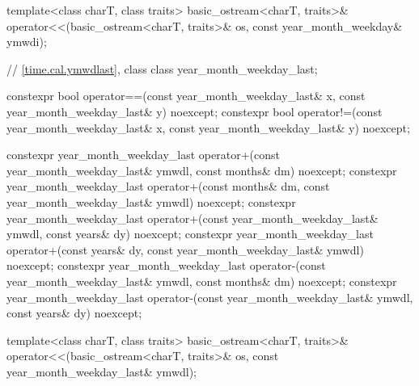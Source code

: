 \begin{codeblock}
{{    template<class charT, class traits>
      basic_ostream<charT, traits>&
        operator<<(basic_ostream<charT, traits>& os, const year_month_weekday& ymwdi);

    // \ref{time.cal.ymwdlast}, class 
    class year_month_weekday_last;

    constexpr bool operator==(const year_month_weekday_last& x,
                              const year_month_weekday_last& y) noexcept;
    constexpr bool operator!=(const year_month_weekday_last& x,
                              const year_month_weekday_last& y) noexcept;

    constexpr year_month_weekday_last
      operator+(const year_month_weekday_last& ymwdl, const months& dm) noexcept;
    constexpr year_month_weekday_last
      operator+(const months& dm, const year_month_weekday_last& ymwdl) noexcept;
    constexpr year_month_weekday_last
      operator+(const year_month_weekday_last& ymwdl, const years& dy) noexcept;
    constexpr year_month_weekday_last
      operator+(const years& dy, const year_month_weekday_last& ymwdl) noexcept;
    constexpr year_month_weekday_last
      operator-(const year_month_weekday_last& ymwdl, const months& dm) noexcept;
    constexpr year_month_weekday_last
      operator-(const year_month_weekday_last& ymwdl, const years& dy) noexcept;

    template<class charT, class traits>
      basic_ostream<charT, traits>&
        operator<<(basic_ostream<charT, traits>& os, const year_month_weekday_last& ymwdl);

}}
\end{codeblock}
